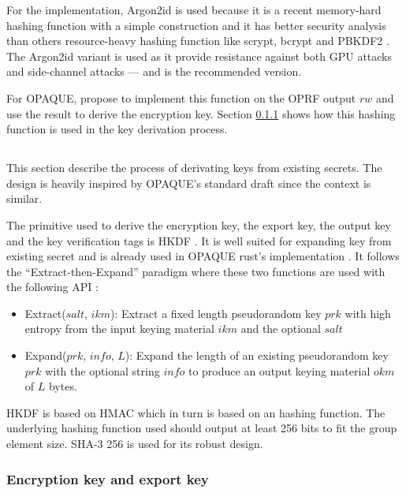 \documentclass[../report.tex]{subfiles}
\begin{document}
For the implementation, Argon2id \cite{Argon2_Paper} is used because it is a recent memory-hard hashing function with a simple construction and it has better security analysis than others resource-heavy hashing function like scrypt, bcrypt and PBKDF2 \cite{CAA}. The Argon2id variant is used as it provide resistance against both GPU attacks and side-channel attacks --- and is the recommended version.

For OPAQUE, \cite{OPAQUE_Standard_Draft} propose to implement this function on the OPRF output $rw$ and use the result to derive the encryption key. Section \ref{sec:encryption_key} shows how this hashing function is used in the key derivation process.





\subsection{}

This section describe the process of derivating keys from existing secrets. The design is heavily inspired by OPAQUE's standard draft \cite{OPAQUE_Standard_Draft} since the context is similar.


The primitive used to derive the encryption key, the export key, the output key and the key verification tags is HKDF \cite{HKDF_RFC}. It is well suited for expanding key from existing secret and is already used in OPAQUE rust's implementation \cite{OPAQUE-KE}. It follows the ``Extract-then-Expand'' paradigm where these two functions are used with the following API :

\begin{itemize}
 \item Extract($salt$, $ikm$): Extract a fixed length pseudorandom key $prk$ with high entropy from the input keying material $ikm$ and the optional $salt$
 \item Expand($prk$, $info$, $L$): Expand the length of an existing pseudorandom key $prk$ with the optional string $info$ to produce an output keying material $okm$ of $L$ bytes.
\end{itemize}

HKDF is based on HMAC which in turn is based on an hashing function. The underlying hashing function used should output at least 256 bits to fit the group element size. SHA-3 256 is used for its robust design.



\subsubsection{Encryption key and export key}
\label{sec:encryption_key}
\end{document}
